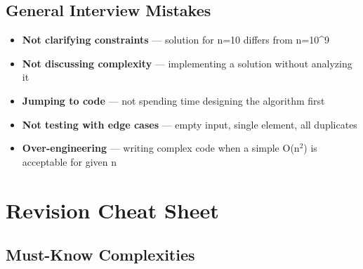 \documentclass[11pt]{article}
\providecommand{\tightlist}{\setlength{\itemsep}{1pt}\setlength{\parskip}{0pt}}
\begin{document}
\subsection{General Interview Mistakes}\label{general-interview-mistakes}

\begin{itemize}
\tightlist
\item
  \textbf{Not clarifying constraints} --- solution for n=10 differs from n=10\^{}9
\item
  \textbf{Not discussing complexity} --- implementing a solution without analyzing it
\item
  \textbf{Jumping to code} --- not spending time designing the algorithm first
\item
  \textbf{Not testing with edge cases} --- empty input, single element, all duplicates
\item
  \textbf{Over-engineering} --- writing complex code when a simple O(n\(^2\)) is acceptable for given n
\end{itemize}

\section{Revision Cheat Sheet}\label{revision-cheat-sheet}

\subsection{Must-Know Complexities}\label{must-know-complexities}
\end{document}
